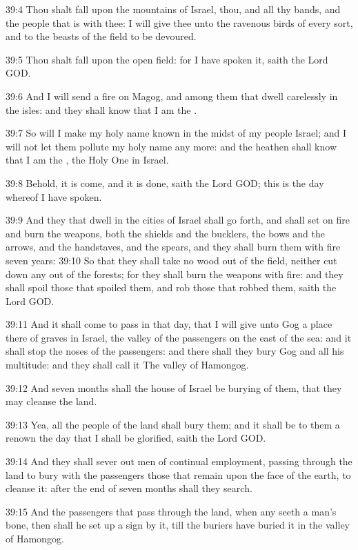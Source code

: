 39:4 Thou shalt fall upon the mountains of Israel, thou, and all thy bands, and the people that is with thee: I will give thee unto the ravenous birds of every sort, and to the beasts of the field to be devoured.

39:5 Thou shalt fall upon the open field: for I have spoken it, saith the Lord GOD.

39:6 And I will send a fire on Magog, and among them that dwell carelessly in the isles: and they shall know that I am the \LORD.

39:7 So will I make my holy name known in the midst of my people Israel; and I will not let them pollute my holy name any more: and the heathen shall know that I am the \LORD, the Holy One in Israel.

39:8 Behold, it is come, and it is done, saith the Lord GOD; this is the day whereof I have spoken.

39:9 And they that dwell in the cities of Israel shall go forth, and shall set on fire and burn the weapons, both the shields and the bucklers, the bows and the arrows, and the handstaves, and the spears, and they shall burn them with fire seven years: 39:10 So that they shall take no wood out of the field, neither cut down any out of the forests; for they shall burn the weapons with fire: and they shall spoil those that spoiled them, and rob those that robbed them, saith the Lord GOD.

39:11 And it shall come to pass in that day, that I will give unto Gog a place there of graves in Israel, the valley of the passengers on the east of the sea: and it shall stop the noses of the passengers: and there shall they bury Gog and all his multitude: and they shall call it The valley of Hamongog.

39:12 And seven months shall the house of Israel be burying of them, that they may cleanse the land.

39:13 Yea, all the people of the land shall bury them; and it shall be to them a renown the day that I shall be glorified, saith the Lord GOD.

39:14 And they shall sever out men of continual employment, passing through the land to bury with the passengers those that remain upon the face of the earth, to cleanse it: after the end of seven months shall they search.

39:15 And the passengers that pass through the land, when any seeth a man's bone, then shall he set up a sign by it, till the buriers have buried it in the valley of Hamongog.

